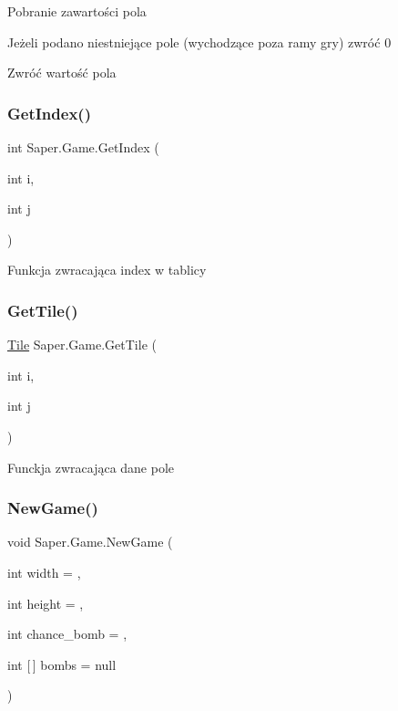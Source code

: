 Pobranie zawartości pola

Jeżeli podano niestniejące pole (wychodzące poza ramy gry) zwróć 0

Zwróć wartość pola \mbox{\label{class_saper_1_1_game_a036a73f7d4b60dada7ec45c9a712eff4}} 
\subsubsection{\texorpdfstring{GetIndex()}{GetIndex()}}
{\footnotesize\ttfamily int Saper.\+Game.\+Get\+Index (\begin{DoxyParamCaption}\item[{int}]{i,  }\item[{int}]{j }\end{DoxyParamCaption})}

Funkcja zwracająca index w tablicy \mbox{\label{class_saper_1_1_game_aad59b3c8d1d9ca582a9b508aad99631a}} 
\subsubsection{\texorpdfstring{GetTile()}{GetTile()}}
{\footnotesize\ttfamily \mbox{\hyperlink{class_saper_1_1_tile}{Tile}} Saper.\+Game.\+Get\+Tile (\begin{DoxyParamCaption}\item[{int}]{i,  }\item[{int}]{j }\end{DoxyParamCaption})}

Funckja zwracająca dane pole \mbox{\label{class_saper_1_1_game_a77b5cf2c44e21908cbbe17622ef1c2db}} 
\subsubsection{\texorpdfstring{NewGame()}{NewGame()}}
{\footnotesize\ttfamily void Saper.\+Game.\+New\+Game (\begin{DoxyParamCaption}\item[{int}]{width = {},  }\item[{int}]{height = {},  }\item[{int}]{chance\+\_\+bomb = {},  }\item[{int \mbox{[}$\,$\mbox{]}}]{bombs = {\ttfamily null} }\end{DoxyParamCaption})}

